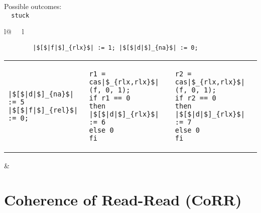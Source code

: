 \begin{minipage}[t]{0.2\linewidth}
Possible outcomes:\\
\lstinline{  stuck}\\
\end{minipage}
%
\begin{minipage}[t]{0.4\linewidth}
\vspace{-.2cm}
  \begin{tabular}{l@{\ \ \ }l}
    \begin{minipage}[l]{4.3cm} \small
\begin{lstlisting}
        |$[$|f|$]_{rlx}$| := 1; |$[$|d|$]_{na}$| := 0;
\end{lstlisting}
\vspace{-.2cm}
\begin{tabular}{l||l||l}
\begin{lstlisting}
|$[$|d|$]_{na}$| := 5
|$[$|f|$]_{rel}$| := 0;
\end{lstlisting}
\hspace{.6cm}
&
\begin{lstlisting}
r1 = cas|$_{rlx,rlx}$|(f, 0, 1);
if r1 == 0
then |$[$|d|$]_{rlx}$| := 6
else 0
fi
\end{lstlisting}
\hspace{.6cm}
&
\begin{lstlisting}
r2 = cas|$_{rlx,rlx}$|(f, 0, 1);
if r2 == 0
then |$[$|d|$]_{rlx}$| := 7
else 0
fi
\end{lstlisting}
\end{tabular}
    \end{minipage}
&
  \end{tabular}
\end{minipage}
\litmusTestEnd

\section{Coherence of Read-Read (CoRR)}
\label{app:corr}

